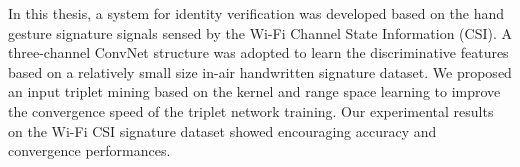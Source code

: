 \label{chp:Conclusion}
In this thesis, a system for identity verification was developed based on the hand gesture signature signals sensed by the Wi-Fi Channel State Information (CSI).
A three-channel ConvNet structure was adopted to learn the discriminative features based on a relatively small size in-air handwritten signature dataset. We proposed an input triplet mining based on the kernel and range space learning to improve the convergence speed of the triplet network training.
Our experimental results on the Wi-Fi CSI signature dataset showed encouraging accuracy and convergence performances.

\iffalse
\section{Future Work}
\begin{enumerate}
	\setlength{\itemsep}{1pt}
	\item Recognizing the in-air signature written along non-LOS. 
	\item Repeating the same data acquisition experiments in a different place
	\item Studying identification performances when multiple people are staying in the same room.
	\item To secure a reliable identification system, spoofing attack scenario should be investigated. 
\end{enumerate} 
\fi

